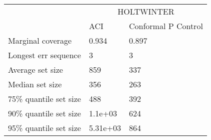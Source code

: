 \begin{tabular}{lll}
\toprule
& \multicolumn{2}{c}{HOLTWINTER} \\
& ACI & Conformal P Control \\
\midrule
Marginal coverage & 0.934 & 0.897 \\
Longest err sequence & 3 & 3 \\
Average set size & 859 & 337 \\
Median set size & 356 & 263 \\
75\% quantile set size & 488 & 392 \\
90\% quantile set size & 1.1e+03 & 624 \\
95\% quantile set size & 5.31e+03 & 864 \\
\bottomrule
\end{tabular}
